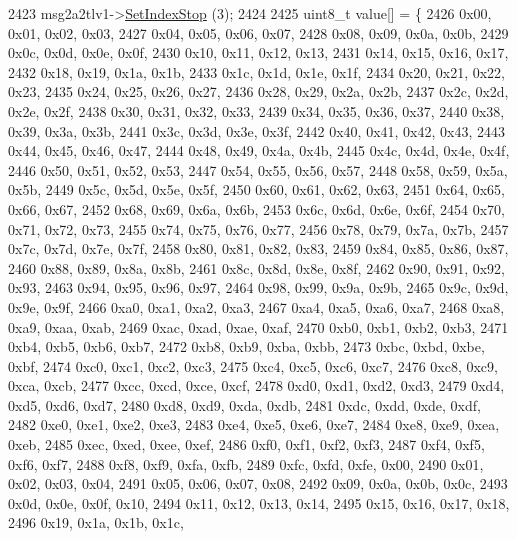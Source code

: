 \begin{DoxyCode}
2423     msg2a2tlv1->\hyperlink{classns3_1_1PbbAddressTlv_af37ebd0d99b8b894fee7cca449d7adb9}{SetIndexStop} (3);
2424 
2425     uint8\_t value[] = \{
2426       0x00, 0x01, 0x02, 0x03,
2427       0x04, 0x05, 0x06, 0x07,
2428       0x08, 0x09, 0x0a, 0x0b,
2429       0x0c, 0x0d, 0x0e, 0x0f,
2430       0x10, 0x11, 0x12, 0x13,
2431       0x14, 0x15, 0x16, 0x17,
2432       0x18, 0x19, 0x1a, 0x1b,
2433       0x1c, 0x1d, 0x1e, 0x1f,
2434       0x20, 0x21, 0x22, 0x23,
2435       0x24, 0x25, 0x26, 0x27,
2436       0x28, 0x29, 0x2a, 0x2b,
2437       0x2c, 0x2d, 0x2e, 0x2f,
2438       0x30, 0x31, 0x32, 0x33,
2439       0x34, 0x35, 0x36, 0x37,
2440       0x38, 0x39, 0x3a, 0x3b,
2441       0x3c, 0x3d, 0x3e, 0x3f,
2442       0x40, 0x41, 0x42, 0x43,
2443       0x44, 0x45, 0x46, 0x47,
2444       0x48, 0x49, 0x4a, 0x4b,
2445       0x4c, 0x4d, 0x4e, 0x4f,
2446       0x50, 0x51, 0x52, 0x53,
2447       0x54, 0x55, 0x56, 0x57,
2448       0x58, 0x59, 0x5a, 0x5b,
2449       0x5c, 0x5d, 0x5e, 0x5f,
2450       0x60, 0x61, 0x62, 0x63,
2451       0x64, 0x65, 0x66, 0x67,
2452       0x68, 0x69, 0x6a, 0x6b,
2453       0x6c, 0x6d, 0x6e, 0x6f,
2454       0x70, 0x71, 0x72, 0x73,
2455       0x74, 0x75, 0x76, 0x77,
2456       0x78, 0x79, 0x7a, 0x7b,
2457       0x7c, 0x7d, 0x7e, 0x7f,
2458       0x80, 0x81, 0x82, 0x83,
2459       0x84, 0x85, 0x86, 0x87,
2460       0x88, 0x89, 0x8a, 0x8b,
2461       0x8c, 0x8d, 0x8e, 0x8f,
2462       0x90, 0x91, 0x92, 0x93,
2463       0x94, 0x95, 0x96, 0x97,
2464       0x98, 0x99, 0x9a, 0x9b,
2465       0x9c, 0x9d, 0x9e, 0x9f,
2466       0xa0, 0xa1, 0xa2, 0xa3,
2467       0xa4, 0xa5, 0xa6, 0xa7,
2468       0xa8, 0xa9, 0xaa, 0xab,
2469       0xac, 0xad, 0xae, 0xaf,
2470       0xb0, 0xb1, 0xb2, 0xb3,
2471       0xb4, 0xb5, 0xb6, 0xb7,
2472       0xb8, 0xb9, 0xba, 0xbb,
2473       0xbc, 0xbd, 0xbe, 0xbf,
2474       0xc0, 0xc1, 0xc2, 0xc3,
2475       0xc4, 0xc5, 0xc6, 0xc7,
2476       0xc8, 0xc9, 0xca, 0xcb,
2477       0xcc, 0xcd, 0xce, 0xcf,
2478       0xd0, 0xd1, 0xd2, 0xd3,
2479       0xd4, 0xd5, 0xd6, 0xd7,
2480       0xd8, 0xd9, 0xda, 0xdb,
2481       0xdc, 0xdd, 0xde, 0xdf,
2482       0xe0, 0xe1, 0xe2, 0xe3,
2483       0xe4, 0xe5, 0xe6, 0xe7,
2484       0xe8, 0xe9, 0xea, 0xeb,
2485       0xec, 0xed, 0xee, 0xef,
2486       0xf0, 0xf1, 0xf2, 0xf3,
2487       0xf4, 0xf5, 0xf6, 0xf7,
2488       0xf8, 0xf9, 0xfa, 0xfb,
2489       0xfc, 0xfd, 0xfe, 0x00,
2490       0x01, 0x02, 0x03, 0x04,
2491       0x05, 0x06, 0x07, 0x08,
2492       0x09, 0x0a, 0x0b, 0x0c,
2493       0x0d, 0x0e, 0x0f, 0x10,
2494       0x11, 0x12, 0x13, 0x14,
2495       0x15, 0x16, 0x17, 0x18,
2496       0x19, 0x1a, 0x1b, 0x1c,

\end{DoxyCode}
